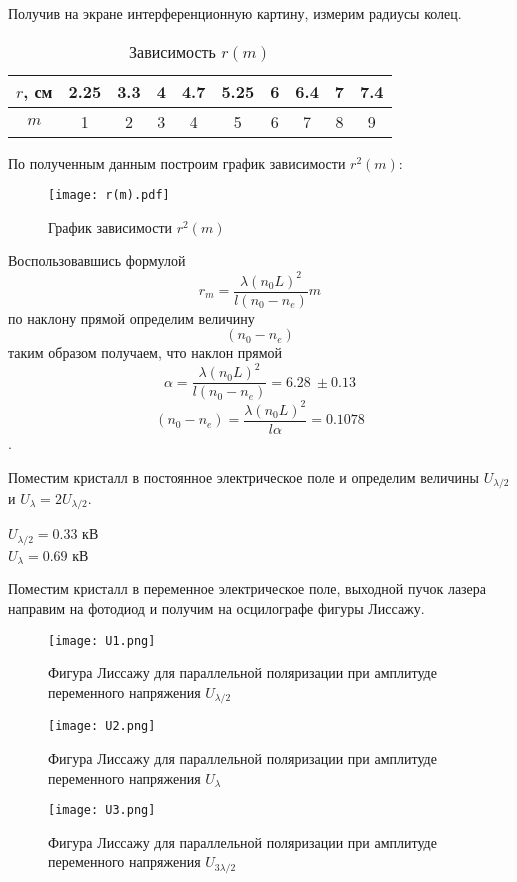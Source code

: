 Получив на экране интерференционную картину, измерим радиусы колец.

\begin{table}[h!]
	\centering
	\begin{tabular}{|c|c|c|c|c|c|c|c|c|c|}
		\hline
		$r$, см & 2.25 & 3.3 & 4 & 4.7 & 5.25 & 6 & 6.4 & 7 & 7.4 \\ \hline
		$m$     & 1    & 2   & 3 & 4   & 5    & 6 & 7   & 8 & 9   \\ \hline
	\end{tabular}
	\caption{Зависимость $r(m)$}
\end{table}

По полученным данным построим график зависимости $r^2(m)$:

\begin{figure}
	\centering
	\texttt{[image: r(m).pdf]}
	\caption{График зависимости $r^2(m)$}
\end{figure}

Воспользовавшись формулой $$r_m = \frac{\lambda (n_0 L)^2}{l (n_0 - n_e)} m $$ по наклону прямой определим величину $$(n_0 - n_e)$$ таким образом получаем, что наклон прямой $$\alpha = \frac{\lambda (n_0 L)^2}{l (n_0 - n_e)} = 6.28 ~ \pm 0.13$$ $$(n_0 - n_e) = \frac{\lambda (n_0 L)^2}{l \alpha} = 0.1078$$.

Поместим кристалл в постоянное электрическое поле и определим величины $U_{\lambda/2}$ и $U_{\lambda} = 2 U_{\lambda/2}$.

\begin{center}
	$U_{\lambda/2} = 0.33$ кВ \\
	$U_{\lambda} = 0.69$ кВ \\
\end{center}

Поместим кристалл в переменное электрическое поле, выходной пучок лазера направим на фотодиод и получим на осцилографе фигуры Лиссажу.

\begin{figure}
	\centering
	\texttt{[image: U1.png]}
	\caption{Фигура Лиссажу для параллельной поляризации при амплитуде переменного напряжения $U_{\lambda/2}$}
\end{figure}

\begin{figure}
	\centering
	\texttt{[image: U2.png]}
	\caption{Фигура Лиссажу для параллельной поляризации при амплитуде переменного напряжения $U_{\lambda}$}
\end{figure}

\begin{figure}
	\centering
	\texttt{[image: U3.png]}
	\caption{Фигура Лиссажу для параллельной поляризации при амплитуде переменного напряжения $U_{3\lambda/2}$}
\end{figure} 

